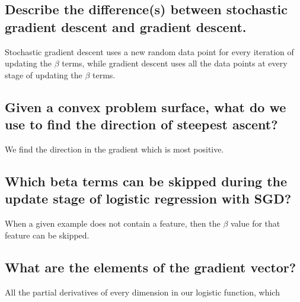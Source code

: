 \documentclass{article}
\begin{document}
\subsection{Describe the difference(s) between stochastic gradient descent and gradient descent.}
Stochastic gradient descent uses a new random data point for every iteration of updating the $\beta$ terms, while gradient descent uses all the data points at every stage of updating the $\beta$ terms. 

\subsection{Given a convex problem surface, what do we use to find the direction of steepest ascent?}
We find the direction in the gradient which is most positive.

\subsection{Which beta terms can be skipped during the update stage of logistic regression with SGD?}
When a given example does not contain a feature, then the $\beta$ value for that feature can be skipped. 

\subsection{What are the elements of the gradient vector?}
All the partial derivatives of every  dimension in our logistic function, which 
\end{document}
